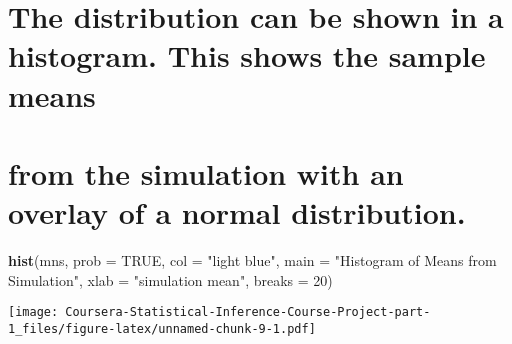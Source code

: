\documentclass[
]{article}
\newenvironment{Shaded}{\begin{snugshade}}{\end{snugshade}}
\newcommand{\DataTypeTok}[1]{\textcolor[rgb]{0.13,0.29,0.53}{#1}}
\newcommand{\DecValTok}[1]{\textcolor[rgb]{0.00,0.00,0.81}{#1}}
\newcommand{\KeywordTok}[1]{\textcolor[rgb]{0.13,0.29,0.53}{\textbf{#1}}}
\newcommand{\NormalTok}[1]{#1}
\newcommand{\OtherTok}[1]{\textcolor[rgb]{0.56,0.35,0.01}{#1}}
\newcommand{\StringTok}[1]{\textcolor[rgb]{0.31,0.60,0.02}{#1}}
\begin{document}
\hypertarget{the-distribution-can-be-shown-in-a-histogram.-this-shows-the-sample-means}{%
\section{The distribution can be shown in a histogram. This shows the
sample
means}\label{the-distribution-can-be-shown-in-a-histogram.-this-shows-the-sample-means}}

\hypertarget{from-the-simulation-with-an-overlay-of-a-normal-distribution.}{%
\section{from the simulation with an overlay of a normal
distribution.}\label{from-the-simulation-with-an-overlay-of-a-normal-distribution.}}

\begin{Shaded}
\begin{Highlighting}[]
\KeywordTok{hist}\NormalTok{(mns, }\DataTypeTok{prob =} \OtherTok{TRUE}\NormalTok{, }\DataTypeTok{col =} \StringTok{"light blue"}\NormalTok{, }\DataTypeTok{main =} 
             \StringTok{"Histogram of Means from Simulation"}\NormalTok{, }\DataTypeTok{xlab =} \StringTok{"simulation mean"}\NormalTok{, }
     \DataTypeTok{breaks =} \DecValTok{20}\NormalTok{)}
\end{Highlighting}
\end{Shaded}

\texttt{[image: Coursera-Statistical-Inference-Course-Project-part-1\_files/figure-latex/unnamed-chunk-9-1.pdf]}
\end{document}
